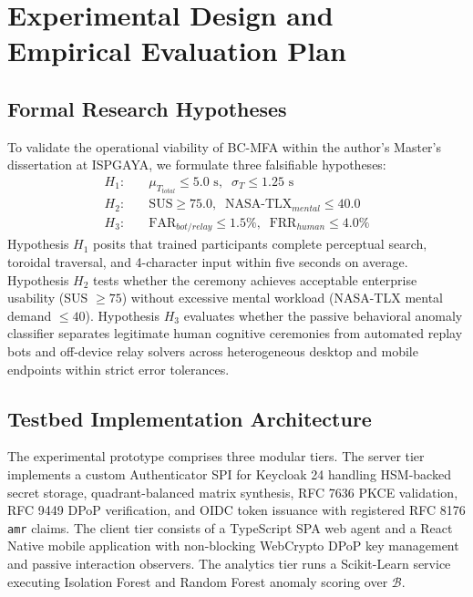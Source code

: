 \section{Experimental Design and Empirical Evaluation Plan}
\label{sec:experimental_design_and_thesis}

\subsection{Formal Research Hypotheses}
To validate the operational viability of BC-MFA within the author's Master's dissertation at ISPGAYA, we formulate three falsifiable hypotheses:
\begin{align}
H_1: &\quad \mu_{T_{total}} \le 5.0\text{ s},\;\; \sigma_{T} \le 1.25\text{ s} \label{eq:h1}\\
H_2: &\quad \text{SUS} \ge 75.0,\;\; \text{NASA-TLX}_{mental} \le 40.0 \label{eq:h2}\\
H_3: &\quad \text{FAR}_{bot/relay} \le 1.5\%,\;\; \text{FRR}_{human} \le 4.0\% \label{eq:h3}
\end{align}
Hypothesis $H_1$ posits that trained participants complete perceptual search, toroidal traversal, and 4-character input within five seconds on average. Hypothesis $H_2$ tests whether the ceremony achieves acceptable enterprise usability (SUS $\ge 75$) without excessive mental workload (NASA-TLX mental demand $\le 40$). Hypothesis $H_3$ evaluates whether the passive behavioral anomaly classifier separates legitimate human cognitive ceremonies from automated replay bots and off-device relay solvers across heterogeneous desktop and mobile endpoints within strict error tolerances.

\subsection{Testbed Implementation Architecture}
The experimental prototype comprises three modular tiers. The server tier implements a custom Authenticator SPI for Keycloak 24 handling HSM-backed secret storage, quadrant-balanced matrix synthesis, RFC 7636 PKCE validation, RFC 9449 DPoP verification, and OIDC token issuance with registered RFC 8176 \texttt{amr} claims. The client tier consists of a TypeScript SPA web agent and a React Native mobile application with non-blocking WebCrypto DPoP key management and passive interaction observers. The analytics tier runs a Scikit-Learn service executing Isolation Forest and Random Forest anomaly scoring over $\mathcal{B}$.

